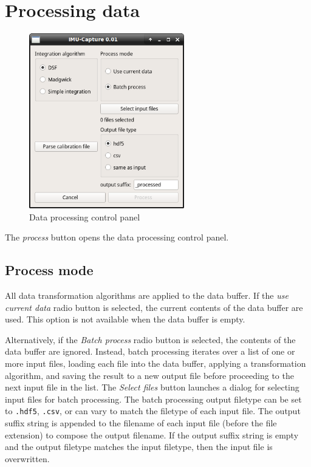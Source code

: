 \documentclass[11pt,letterpaper,article,oneside]{memoir}
\newcommand{\csv}{\texttt{.csv}}
\newcommand{\hdf}{\texttt{.hdf5}}
\begin{document}
\chapter{Processing data}

\begin{figure}[]
    \begin{center}
        \includegraphics[height=3in]{screenshot_process}
    \end{center}
    \caption{Data processing control panel} 
\end{figure}

The \emph{process} button opens the data processing control panel.

\section{Process mode}
All data transformation algorithms are applied to the data buffer. If the \emph{use
current data} radio button is selected, the current contents of the data buffer
are used. This option is not available when the data buffer is empty.

Alternatively, if the \emph{Batch process} radio button is selected,
the contents of the data buffer are ignored. Instead, batch processing iterates
over a list of one or more input files, loading each file into the data buffer,
applying a transformation algorithm, and saving the result to a new output file
before proceeding to the next input file in the list. The \emph{Select files}
button launches a dialog for selecting input files for batch processing.
The batch processing output filetype can be set to \hdf{}, \csv{}, or can vary to
match the filetype of each input file. The output suffix string is appended to
the filename of each input file (before the file extension) to compose the
output filename. If the output suffix string is empty and the output
filetype matches the input filetype, then the input file is overwritten.
\end{document}
